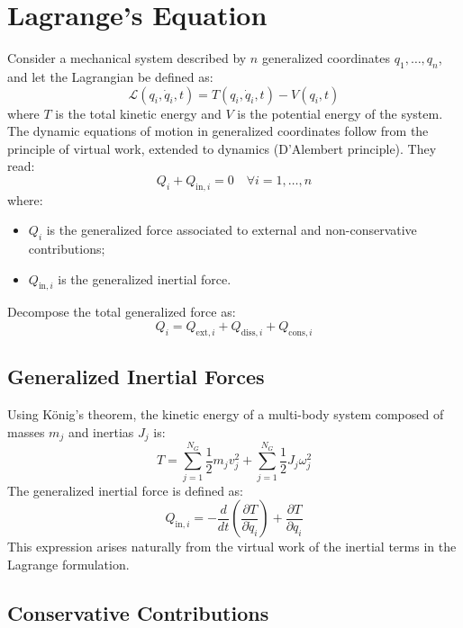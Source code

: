 \section{Lagrange's Equation}

Consider a mechanical system described by \( n \) generalized coordinates \( q_1, \dots, q_n \), and let the Lagrangian be defined as:
\[
\mathcal{L}(q_i, \dot{q}_i, t) = T(q_i, \dot{q}_i, t) - V(q_i, t)
\]
where \( T \) is the total kinetic energy and \( V \) is the potential energy of the system. The dynamic equations of motion in generalized coordinates follow from the principle of virtual work, extended to dynamics (D’Alembert principle). They read:
\[
Q_i + Q_{\text{in},i} = 0 \quad \forall i = 1, \dots, n
\]
where:

\begin{itemize}
    \item \( Q_i \) is the generalized force associated to external and non-conservative contributions;
    \item \( Q_{\text{in},i} \) is the generalized inertial force.
\end{itemize}

Decompose the total generalized force as:
\[
Q_i = Q_{\text{ext},i} + Q_{\text{diss},i} + Q_{\text{cons},i}
\]

\subsection{Generalized Inertial Forces}

Using König’s theorem, the kinetic energy of a multi-body system composed of masses \( m_j \) and inertias \( J_j \) is:
\[
T = \sum_{j=1}^{N_G} \frac{1}{2} m_j v_j^2 + \sum_{j=1}^{N_G} \frac{1}{2} J_j \omega_j^2
\]
The generalized inertial force is defined as:
\[
Q_{\text{in},i} = - \frac{d}{dt} \left( \frac{\partial T}{\partial \dot{q}_i} \right) + \frac{\partial T}{\partial q_i}
\]
This expression arises naturally from the virtual work of the inertial terms in the Lagrange formulation.

\subsection{Conservative Contributions}

